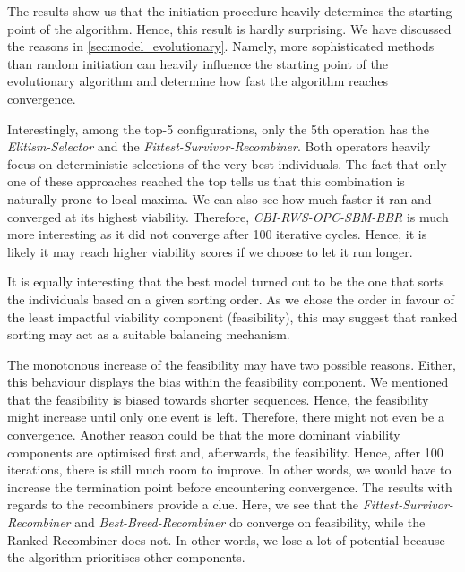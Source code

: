 \documentclass[./../../paper.tex]{subfiles}
\begin{document}
The results show us that the initiation procedure heavily determines the starting point of the algorithm. Hence, this result is hardly surprising. We have discussed the reasons in \autoref{sec:model_evolutionary}. Namely, more sophisticated methods than random initiation can heavily influence the starting point of the evolutionary algorithm and determine how fast the algorithm reaches convergence. 

Interestingly, among the top-5 configurations, only the 5th operation has the \emph{Elitism-Selector} and the \emph{Fittest-Survivor-Recombiner}. Both operators heavily focus on deterministic selections of the very best individuals. The fact that only one of these approaches reached the top tells us that this combination is naturally prone to local maxima. We can also see how much faster it ran and converged at its highest viability. Therefore, \emph{CBI-RWS-OPC-SBM-BBR} is much more interesting as it did not converge after 100 iterative cycles. Hence, it is likely it may reach higher viability scores if we choose to let it run longer.

It is equally interesting that the best model turned out to be the one that sorts the individuals based on a given sorting order. As we chose the order in favour of the least impactful viability component (feasibility), this may suggest that ranked sorting may act as a suitable balancing mechanism. 

The monotonous increase of the feasibility may have two possible reasons. Either, this behaviour displays the bias within the feasibility component. We mentioned that the feasibility is biased towards shorter sequences. Hence, the feasibility might increase until only one event is left. Therefore, there might not even be a convergence. Another reason could be that the more dominant viability components are optimised first and, afterwards, the feasibility. Hence, after 100 iterations, there is still much room to improve. In other words, we would have to increase the termination point before encountering convergence. The results with regards to the recombiners provide a clue. Here, we see that the \emph{Fittest-Survivor-Recombiner} and \emph{Best-Breed-Recombiner} do converge on feasibility, while the {Ranked-Recombiner} does not. In other words, we lose a lot of potential because the algorithm prioritises other components. 
\end{document}

